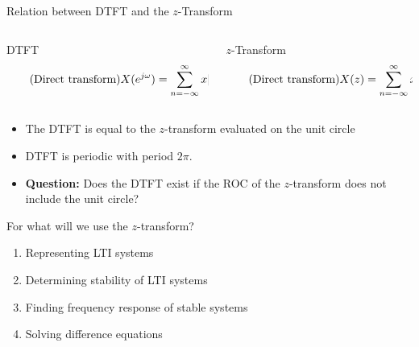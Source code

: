 \documentclass[10pt, handout]{beamer}
\begin{document}
%
\begin{frame}{Relation between DTFT and the $z$-Transform}

\begin{columns}[t]
	\begin{column}{0.5\textwidth}
		\begin{block}{DTFT}
			\vspace{-0.5cm}
			\begin{equation} \tag{Direct transform}
			X(e^{j\omega}) = \sum_{n=-\infty}^{\infty} x[n]\tikz[baseline]{
				\node[fill=blue!20,anchor=base] (t1) {$e^{-j\omega n}$};
			}
			\end{equation}
		\end{block}
	\end{column}
	\begin{column}{0.5\textwidth}
		\begin{block}{$z$-Transform}
			\vspace{-0.2cm}
			\begin{equation} \tag{Direct transform}
			X(z) = \sum_{n=-\infty}^{\infty} x[n]\tikz[baseline]{
				\node[fill=blue!20,anchor=base] (t1) {$z^{-n}$};
			}
			\end{equation}
		\end{block}
	\end{column}
\end{columns}
\vspace{0.4cm}
\begin{itemize}
	\pause\item The DTFT is equal to the $z$-transform evaluated on the unit circle
	\item DTFT is periodic with period $2\pi$.
	\pause\item \textbf{Question:} Does the DTFT exist if the ROC of the $z$-transform does not include the unit circle?
\end{itemize}

\vspace{-0.4cm}
\flushright
\resizebox{0.35\linewidth}{!}{}
\end{frame}

%
\begin{frame}{For what will we use the $z$-transform?}
	\begin{enumerate}
		\item Representing LTI systems
		\item Determining stability of LTI systems
		\item Finding frequency response of stable systems
		\item Solving difference equations
	\end{enumerate}
\end{frame}
\end{document}
